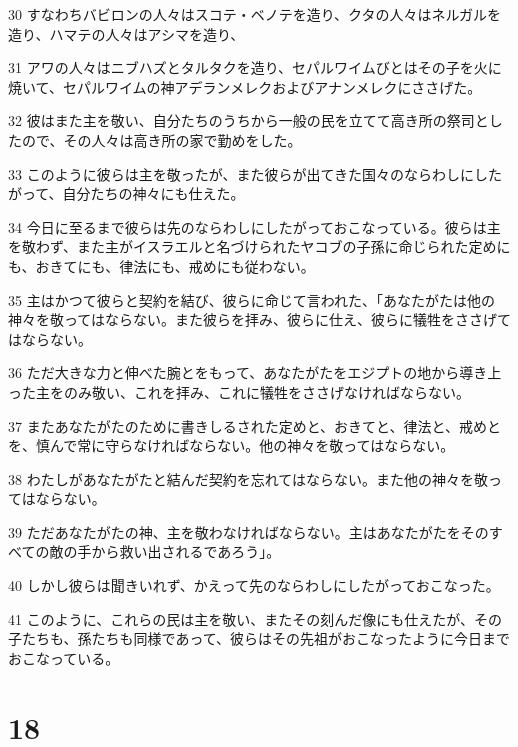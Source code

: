\par 30 すなわちバビロンの人々はスコテ・ベノテを造り、クタの人々はネルガルを造り、ハマテの人々はアシマを造り、
\par 31 アワの人々はニブハズとタルタクを造り、セパルワイムびとはその子を火に焼いて、セパルワイムの神アデランメレクおよびアナンメレクにささげた。
\par 32 彼はまた主を敬い、自分たちのうちから一般の民を立てて高き所の祭司としたので、その人々は高き所の家で勤めをした。
\par 33 このように彼らは主を敬ったが、また彼らが出てきた国々のならわしにしたがって、自分たちの神々にも仕えた。
\par 34 今日に至るまで彼らは先のならわしにしたがっておこなっている。彼らは主を敬わず、また主がイスラエルと名づけられたヤコブの子孫に命じられた定めにも、おきてにも、律法にも、戒めにも従わない。
\par 35 主はかつて彼らと契約を結び、彼らに命じて言われた、「あなたがたは他の神々を敬ってはならない。また彼らを拝み、彼らに仕え、彼らに犠牲をささげてはならない。
\par 36 ただ大きな力と伸べた腕とをもって、あなたがたをエジプトの地から導き上った主をのみ敬い、これを拝み、これに犠牲をささげなければならない。
\par 37 またあなたがたのために書きしるされた定めと、おきてと、律法と、戒めとを、慎んで常に守らなければならない。他の神々を敬ってはならない。
\par 38 わたしがあなたがたと結んだ契約を忘れてはならない。また他の神々を敬ってはならない。
\par 39 ただあなたがたの神、主を敬わなければならない。主はあなたがたをそのすべての敵の手から救い出されるであろう」。
\par 40 しかし彼らは聞きいれず、かえって先のならわしにしたがっておこなった。
\par 41 このように、これらの民は主を敬い、またその刻んだ像にも仕えたが、その子たちも、孫たちも同様であって、彼らはその先祖がおこなったように今日までおこなっている。

\chapter{18}


